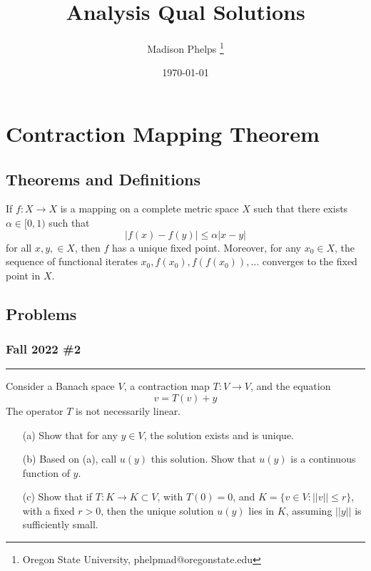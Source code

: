 \documentclass{article}
\title{Analysis Qual Solutions}
\author{Madison Phelps \thanks{Oregon State University, phelpmad@oregonstate.edu}}
\date{\today}
\begin{document}
\maketitle

\thispagestyle{empty}

\break

\tableofcontents

\thispagestyle{empty}

\break

\section{Contraction Mapping Theorem}

\subsection{Theorems and Definitions}

\begin{theorem}\label{thm:banach-fixed-point}
	If $f: X\to X$ is a mapping on a complete metric space $X$ such that there exists $\alpha \in [0,1)$ such that 
	\[|f(x) - f(y)|\leq \alpha |x-y|\]
	for all $x,y,\in X$, then $f$ has a unique fixed point. Moreover, for any $x_0\in X$, the sequence of functional iterates 
	$x_0, f(x_0), f(f(x_0)),\dots$ converges to the fixed point in $X$. 
\end{theorem}

\break

\subsection{Problems}

\subsubsection{Fall 2022 \#2} 

\hrule

Consider a Banach space $V$, a contraction map $T: V\to V$, and the equation
	\[ v = T(v) + y \]
The operator $T$ is not necessarily linear.
	\begin{enumerate}
		\item[(a)] Show that for any $y\in V$, the solution exists and is unique.
		\item[(b)] Based on (a), call $u(y)$ this solution. Show that $u(y)$ is a continuous function
			 of $y$.
		\item[(c)] Show that if $T: K\to K\subset V$, with $T(0) = 0$, and 
			$K = \{ v\in V : || v ||  \leq r\}$,
			with a fixed $r>0$, then the unique solution $u(y)$ lies in $K$, assuming  $ || y || $ is
			sufficiently small.
	\end{enumerate}
	
\end{document}
